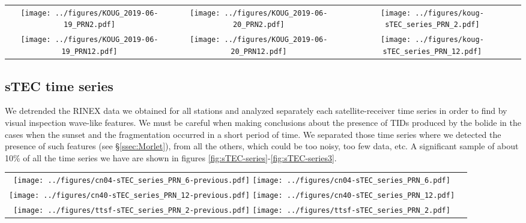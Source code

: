 \begin{figure*}
    \centering
    \begin{tabular}{ccc}
    \texttt{[image: ../figures/KOUG\_2019-06-19\_PRN2.pdf]} & \texttt{[image: ../figures/KOUG\_2019-06-20\_PRN2.pdf]}& \texttt{[image: ../figures/koug-sTEC\_series\_PRN\_2.pdf]} \\
\texttt{[image: ../figures/KOUG\_2019-06-19\_PRN12.pdf]} & \texttt{[image: ../figures/KOUG\_2019-06-20\_PRN12.pdf]} & \texttt{[image: ../figures/koug-sTEC\_series\_PRN\_12.pdf]}
    \end{tabular}
    \caption{Detrended sTEC time series for station KOUG for the days 2019-06-19, 2019-06-20 and 2019-06-22 (three days before meteor fall, two days and the meteor fall date, from left to right). The satellite receiver LOS with PRN 2 is in top, and the LOS with PRN 12 is in bottom.}
    \label{fig:solar_terminator_time_series}
\end{figure*}

\subsection{sTEC time series}

We detrended the RINEX data we obtained for all stations and analyzed separately each satellite-receiver time series in order to find by visual inspection wave-like features. We must be careful when making conclusions about the presence of TIDs produced by the bolide in the cases when the sunset and the fragmentation occurred in a short period of time. We separated those time series where we detected the presence of such features (see \S \ref{ssec:Morlet}), from all the others, which could be too noisy, too few data, etc. A significant sample of about 10\% of all the time series we have are shown in figures \ref{fig:sTEC-series}-\ref{fig:sTEC-series3}.  

\begin{figure*}
    \centering
    \begin{tabular}{cc}
    \texttt{[image: ../figures/cn04-sTEC\_series\_PRN\_6-previous.pdf]}  \texttt{[image: ../figures/cn04-sTEC\_series\_PRN\_6.pdf]}\\
    \texttt{[image: ../figures/cn40-sTEC\_series\_PRN\_12-previous.pdf]}  \texttt{[image: ../figures/cn40-sTEC\_series\_PRN\_12.pdf]}\\
    \texttt{[image: ../figures/ttsf-sTEC\_series\_PRN\_2-previous.pdf]}  \texttt{[image: ../figures/ttsf-sTEC\_series\_PRN\_2.pdf]}\\
    \end{tabular}
    \caption{sTEC time series for stations where TIDs are likely to be detected. In the left panels we show the time series for the previous day of meteor fall, and in the right panels the time series for the meteor fall date.}
    \label{fig:sTEC-series}
\end{figure*}

